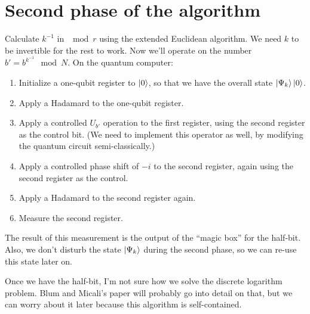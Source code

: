 \documentclass{article}
\begin{document}
\section{Second phase of the algorithm}

Calculate $k^{-1}$ in $\mod r$ using the extended Euclidean algorithm. We need $k$ to be invertible for the rest to work. Now we'll operate on the number $b' = b^{k^{-1}} \mod N$. On the quantum computer:

\begin{enumerate}
    \item Initialize a one-qubit register to $\ket{0}$, so that we have the overall state $\ket{\Psi_k}\ket{0}$.
    \item Apply a Hadamard to the one-qubit register.
    \item Apply a controlled $U_{b'}$ operation to the first register, using the second register as the control bit. (We need to implement this operator as well, by modifying the quantum circuit semi-classically.)
    \item Apply a controlled phase shift of $-i$ to the second register, again using the second register as the control.
    \item Apply a Hadamard to the second register again.
    \item Measure the second register.
\end{enumerate}

The result of this measurement is the output of the ``magic box'' for the half-bit. Also, we don't disturb the state $\ket{\Psi_k}$ during the second phase, so we can re-use this state later on.

Once we have the half-bit, I'm not sure how we solve the discrete logarithm problem. Blum and Micali's paper will probably go into detail on that, but we can worry about it later because this algorithm is self-contained.
\end{document}
